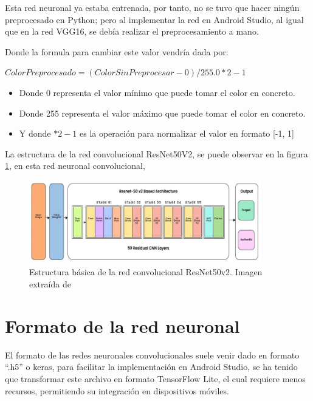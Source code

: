 Esta red neuronal ya estaba entrenada, por tanto, no se tuvo que hacer ningún preprocesado en Python; pero al implementar la red en Android Studio, al igual que en la red VGG16, se debía realizar el preprocesamiento a mano.

Donde la formula para cambiar este valor vendría dada por: 
\begin{center}
    $ColorPreprocesado = (ColorSinPreprocesar - 0)/ 255.0 * 2 - 1$
    \begin{itemize}
        \item Donde 0 representa el valor mínimo que puede tomar el color en concreto.
        \item Donde 255 representa el valor máximo que puede tomar el color en concreto.
        \item Y donde $ * 2 - 1 $ es la operación para normalizar el valor en formato [-1, 1]
    \end{itemize}
\end{center}

La estructura de la red convolucional ResNet50V2, se puede observar en la figura \ref{fig:ResNet50v2-struct}, en esta red neuronal convolucional,  
\begin{figure}[!ht]
         \centering
         \includegraphics[width=0.9\textwidth]{img/ResNet50v2-architecture.jpg}
         \caption{Estructura básica de la red convolucional ResNet50v2. Imagen extraída de \cite{ResNet50v2-architecture}}
         \label{fig:ResNet50v2-struct}
\end{figure}

\section{Formato de la red neuronal}

El formato de las redes neuronales convolucionales suele venir dado en formato ``.h5'' o keras, para facilitar la implementación en Android Studio, se ha tenido que transformar este archivo en formato TensorFlow Lite, el cual requiere menos recursos, permitiendo su integración en dispositivos móviles.

